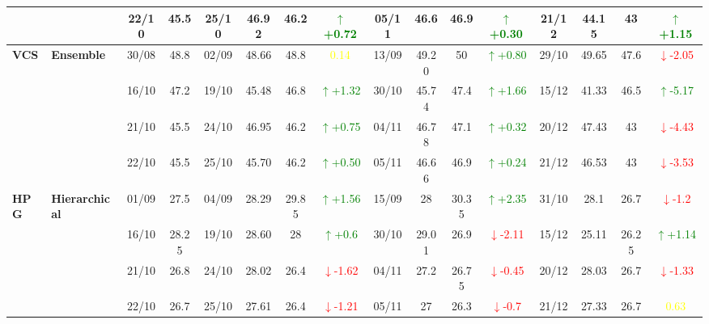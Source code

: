 \documentclass{ieeeaccess}
\begin{document}
{\begin{longtable}{llcc|cccc|cccc|cccc}
&
& 22/10 & 45.5 & 25/10 & 46.92 & 46.2 & \textcolor{green}{\(\uparrow\)+0.72} & 05/11 & 46.6 & 46.9 & \textcolor{green}{\(\uparrow\)+0.30} & 21/12 & 44.15 & 43 & \textcolor{green}{\(\uparrow\)+1.15} \\
\midrule



\multirow{4}{*}{\textbf{VCS}} 
& \textbf{Ensemble}
& 30/08 & 48.8 & 02/09 & 48.66 & 48.8 & \textcolor{yellow}{0.14} & 13/09 & 49.20 & 50 & \textcolor{green}{\(\uparrow\)+0.80} & 29/10 & 49.65 & 47.6 & \textcolor{red}{\(\downarrow\)-2.05} \\

&
& 16/10 & 47.2 & 19/10 & 45.48 & 46.8 & \textcolor{green}{\(\uparrow\)+1.32} & 30/10 & 45.74 & 47.4 & \textcolor{green}{\(\uparrow\)+1.66} & 15/12 & 41.33 & 46.5 & \textcolor{green}{\(\uparrow\)-5.17} \\

&
& 21/10 & 45.5 & 24/10 & 46.95 & 46.2 & \textcolor{green}{\(\uparrow\)+0.75} & 04/11 & 46.78 & 47.1 & \textcolor{green}{\(\uparrow\)+0.32} & 20/12 & 47.43 & 43 & \textcolor{red}{\(\downarrow\)-4.43} \\

&
& 22/10 & 45.5 & 25/10 & 45.70 & 46.2 & \textcolor{green}{\(\uparrow\)+0.50} & 05/11 & 46.66 & 46.9 & \textcolor{green}{\(\uparrow\)+0.24} & 21/12 & 46.53 & 43 & \textcolor{red}{\(\downarrow\)-3.53}  \\


\multirow{4}{*}{\textbf{HPG}} 
& \textbf{Hierarchical}
& 01/09 & 27.5 & 04/09 & 28.29 & 29.85 & \textcolor{green}{\(\uparrow\)+1.56} & 15/09 & 28 & 30.35 & \textcolor{green}{\(\uparrow\)+2.35} & 31/10 & 28.1 & 26.7 & \textcolor{red}{\(\downarrow\)-1.2} \\

& 
& 16/10 & 28.25 & 19/10 & 28.60 & 28 & \textcolor{green}{\(\uparrow\)+0.6} & 30/10 & 29.01 & 26.9 & \textcolor{red}{\(\downarrow\)-2.11} & 15/12 & 25.11 & 26.25 & \textcolor{green}{\(\uparrow\)+1.14} \\

& 
& 21/10 & 26.8 & 24/10 & 28.02 & 26.4 & \textcolor{red}{\(\downarrow\)-1.62} & 04/11 & 27.2 & 26.75 & \textcolor{red}{\(\downarrow\)-0.45} & 20/12 & 28.03 & 26.7 & \textcolor{red}{\(\downarrow\)-1.33} \\

&
& 22/10 & 26.7 & 25/10 & 27.61 & 26.4 & \textcolor{red}{\(\downarrow\)-1.21} & 05/11 & 27 & 26.3 & \textcolor{red}{\(\downarrow\)-0.7} & 21/12 & 27.33 & 26.7 & \textcolor{yellow}{0.63} \\
\midrule



\end{longtable}}
\end{document}
